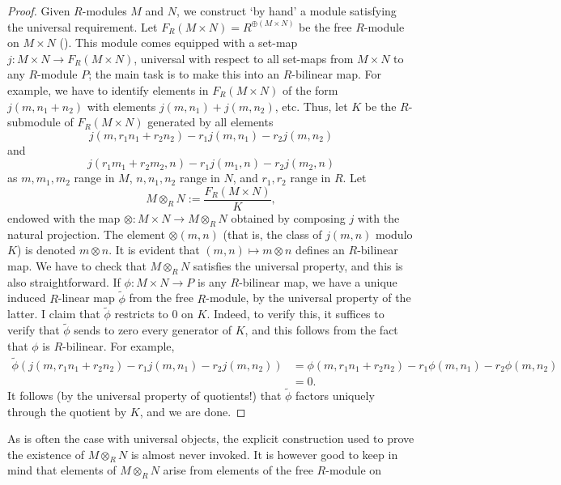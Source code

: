 \begin{proof}
  Given $R$-modules $M$ and $N$, we construct `by hand' a module
  satisfying the universal requirement. Let
  $F_R(M \times N) = R^{\oplus(M \times N)}$ be the free $R$-module on
  $M \times N$
  (). This module
  comes equipped with a set-map $j : M \times N \to F_R(M \times N)$,
  universal with respect to all set-maps from $M \times N$ to any
  $R$-module $P$; the main task is to make this into an $R$-bilinear
  map. For example, we have to identify elements in $F_R(M \times N)$
  of the form $j(m, n_1 + n_2)$ with elements $j(m, n_1) + j(m, n_2)$,
  etc. Thus, let $K$ be the $R$-submodule of $F_R(M \times N)$
  generated by all elements
  \[
    j(m, r_1 n_1 + r_2 n_2) - r_1 j(m, n_1) - r_2 j(m, n_2)
  \]
  and
  \[
    j(r_1 m_1 + r_2 m_2, n) - r_1 j(m_1, n) - r_2 j(m_2, n)
  \]
  as $m, m_1, m_2$ range in $M$, $n, n_1, n_2$ range in $N$, and
  $r_1, r_2$ range in $R$. Let
  \[
    M \otimes_R N := \frac{F_R(M \times N)}{K},
  \]
  endowed with the map $\otimes : M \times N \to M \otimes_R N$
  obtained by composing $j$ with the natural projection. The element
  $\otimes(m, n)$ (that is, the class of $j(m, n)$ modulo $K$) is
  denoted $m \otimes n$. It is evident that
  $(m, n) \mapsto m \otimes n$ defines an $R$-bilinear map. We have to
  check that $M \otimes_R N$ satisfies the universal property, and
  this is also straightforward. If $\phi : M \times N \to P$ is any
  $R$-bilinear map, we have a unique induced $R$-linear map
  $\tilde{\phi}$ from the free $R$-module, by the universal property
  of the latter. I claim that $\tilde{\phi}$ restricts to $0$ on
  $K$. Indeed, to verify this, it suffices to verify that
  $\tilde{\phi}$ sends to zero every generator of $K$, and this
  follows from the fact that $\phi$ is $R$-bilinear. For example,
  \begin{align*}
    \tilde{\phi}(j(m, r_1 n_1 + r_2 n_2) - r_1 j(m,n_1) - r_2 j(m,n_2))
    &= \phi(m, r_1 n_1 + r_2 n_2) - r_1 \phi(m, n_1) - r_2 \phi(m, n_2)
    \\
    &= 0.
  \end{align*}
  It follows (by the universal property of quotients!) that
  $\tilde{\phi}$ factors uniquely through the quotient by $K$, and we
  are done.
\end{proof}
As is often the case with universal objects, the explicit construction
used to prove the existence of $M \otimes_R N$ is almost never
invoked.  It is however good to keep in mind that elements of
$M \otimes_R N$ arise from elements of the free $R$-module on
